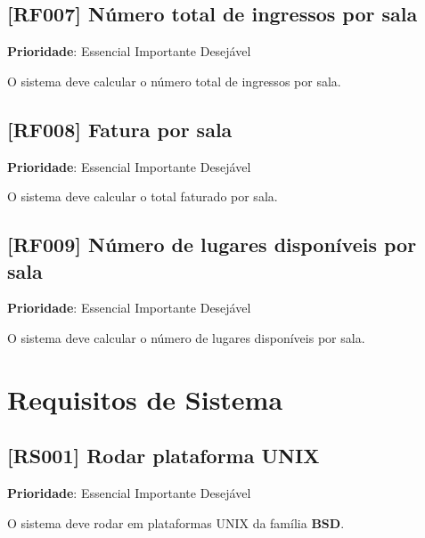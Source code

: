 \documentclass[12pt,a4paper]{article}
\let\oldsection\section
\renewcommand\section{\clearpage\oldsection}
\begin{document}
\subsection{[RF007] Número total de ingressos por sala}

\textbf{Prioridade}:
\mbox{\ooalign{$\checkmark$\cr\hidewidth$\square$\hidewidth\cr}} Essencial
\mbox{\ooalign{\cr\hidewidth$\square$\hidewidth\cr}} Importante
\mbox{\ooalign{\cr\hidewidth$\square$\hidewidth\cr}} Desejável

O sistema deve calcular o número total de ingressos por sala.

\subsection{[RF008] Fatura por sala}

\textbf{Prioridade}:
\mbox{\ooalign{$\checkmark$\cr\hidewidth$\square$\hidewidth\cr}} Essencial
\mbox{\ooalign{\cr\hidewidth$\square$\hidewidth\cr}} Importante
\mbox{\ooalign{\cr\hidewidth$\square$\hidewidth\cr}} Desejável

O sistema deve calcular o total faturado por sala.

\subsection{[RF009] Número de lugares disponíveis por sala}

\textbf{Prioridade}:
\mbox{\ooalign{$\checkmark$\cr\hidewidth$\square$\hidewidth\cr}} Essencial
\mbox{\ooalign{\cr\hidewidth$\square$\hidewidth\cr}} Importante
\mbox{\ooalign{\cr\hidewidth$\square$\hidewidth\cr}} Desejável

O sistema deve calcular o número de lugares disponíveis por sala.

\section{Requisitos de Sistema}

\subsection{[RS001] Rodar plataforma UNIX}

\textbf{Prioridade}:
\mbox{\ooalign{\cr\hidewidth$\square$\hidewidth\cr}} Essencial
\mbox{\ooalign{$\checkmark$\cr\hidewidth$\square$\hidewidth\cr}} Importante
\mbox{\ooalign{\cr\hidewidth$\square$\hidewidth\cr}} Desejável

O sistema deve rodar em plataformas UNIX da família \textbf{BSD}.
\end{document}
